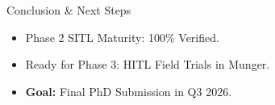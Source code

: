 \documentclass{beamer}
\begin{document}
\begin{frame}{Conclusion & Next Steps}
    \begin{itemize}
        \item Phase 2 SITL Maturity: 100\% Verified.
        \item Ready for Phase 3: HITL Field Trials in Munger.
        \item \textbf{Goal:} Final PhD Submission in Q3 2026.
    \end{itemize}
\end{frame}
\end{document}
